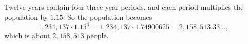 Twelve years contain four three-year periods, and each period multiplies the population by $1.15$. So the population becomes
\[
1{,}234{,}137\cdot1.15^4=1{,}234{,}137\cdot1.74900625=2{,}158{,}513.33\ldots,
\]
which is about $\boxed{2{,}158{,}513}$ people.
